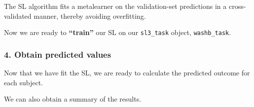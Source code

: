 \documentclass[12pt, krantz2,]{krantz}
\newenvironment{Shaded}{\begin{snugshade}}{\end{snugshade}}
\newcommand{\CommentTok}[1]{\textcolor[rgb]{0.37,0.37,0.37}{\textit{#1}}}
\newcommand{\DecValTok}[1]{\textcolor[rgb]{0.06,0.06,0.06}{#1}}
\newcommand{\KeywordTok}[1]{\textcolor[rgb]{0.27,0.27,0.27}{\textbf{#1}}}
\newcommand{\NormalTok}[1]{#1}
\newcommand{\OperatorTok}[1]{\textcolor[rgb]{0.43,0.43,0.43}{\textbf{#1}}}
\newcommand{\StringTok}[1]{\textcolor[rgb]{0.5,0.5,0.5}{#1}}
\theoremstyle{definition}
\theoremstyle{definition}
\theoremstyle{definition}
\newcommand{\1}{\mathbbm{1}}
\begin{document}
The SL algorithm fits a metalearner on the validation-set predictions in a
cross-validated manner, thereby avoiding overfitting.

Now we are ready to \textbf{``train''} our SL on our \texttt{sl3\_task} object, \texttt{washb\_task}.

\begin{Shaded}
\end{Shaded}

\hypertarget{obtain-predicted-values}{%
\subsubsection*{4. Obtain predicted values}\label{obtain-predicted-values}}


Now that we have fit the SL, we are ready to calculate the predicted outcome
for each subject.

\begin{Shaded}
\end{Shaded}

We can also obtain a summary of the results.
\end{document}
